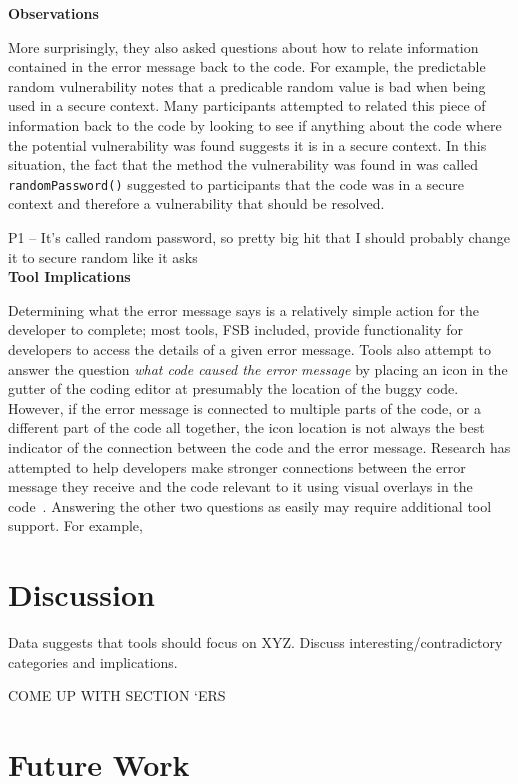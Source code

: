 \documentclass[conference]{IEEEtran}
\begin{document}
\noindent\textbf{Observations}

More surprisingly, they also asked questions about how to relate information contained in the error message back to the code. 
For example, the predictable random vulnerability notes that a predicable random value is bad when being used in a secure context. 
Many participants attempted to related this piece of information back to the code by looking to see if anything about the code where the potential vulnerability was found suggests it is in a secure context. 
In this situation, the fact that the method the vulnerability was found in was called \texttt{randomPassword()} suggested to participants that the code was in a secure context and therefore a vulnerability that should be resolved.

P1 -- It's called random password, so pretty big hit that I should probably change it to secure random like it asks
\\

\noindent\textbf{Tool Implications}

Determining what the error message says is a relatively simple action for the developer to complete; most tools, FSB included, provide functionality for developers to access the details of a given error message. 
Tools also attempt to answer the question \emph{what code caused the error message} by placing an icon in the gutter of the coding editor at presumably the location of the buggy code. 
However, if the error message is connected to multiple parts of the code, or a different part of the code all together, the icon location is not always the best indicator of the connection between the code and the error message. 
Research has attempted to help developers make stronger connections between the error message they receive and the code relevant to it using visual overlays in the code~\cite{barik14visual}.
Answering the other two questions as easily may require additional tool support. For example, 


\section{Discussion}
\label{sec:disc}
Data suggests that tools should focus on XYZ. Discuss interesting/contradictory categories and implications.

COME UP WITH SECTION `ERS


\section{Future Work}
\label{sec:fw}
\end{document}
